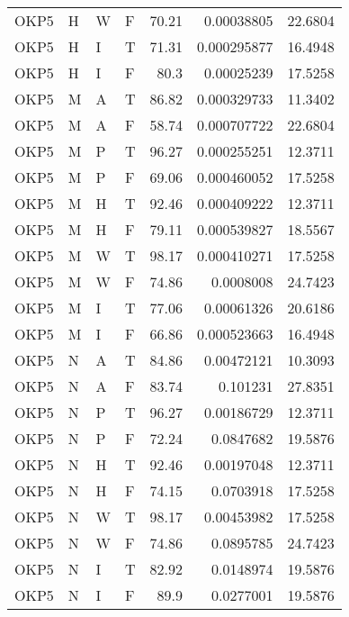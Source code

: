 \begin{table}[!htb]
{\begin{tabular}{llllrrr}
            OKP5     & H     & W     & F          & 70.21      & 0.00038805  & 22.6804  \\
            OKP5     & H     & I     & T          & 71.31      & 0.000295877 & 16.4948  \\
            OKP5     & H     & I     & F          & 80.3       & 0.00025239  & 17.5258  \\
            OKP5     & M     & A     & T          & 86.82      & 0.000329733 & 11.3402  \\
            OKP5     & M     & A     & F          & 58.74      & 0.000707722 & 22.6804  \\
            OKP5     & M     & P     & T          & 96.27      & 0.000255251 & 12.3711  \\
            OKP5     & M     & P     & F          & 69.06      & 0.000460052 & 17.5258  \\
            OKP5     & M     & H     & T          & 92.46      & 0.000409222 & 12.3711  \\
            OKP5     & M     & H     & F          & 79.11      & 0.000539827 & 18.5567  \\
            OKP5     & M     & W     & T          & 98.17      & 0.000410271 & 17.5258  \\
            OKP5     & M     & W     & F          & 74.86      & 0.0008008   & 24.7423  \\
            OKP5     & M     & I     & T          & 77.06      & 0.00061326  & 20.6186  \\
            OKP5     & M     & I     & F          & 66.86      & 0.000523663 & 16.4948  \\
            OKP5     & N     & A     & T          & 84.86      & 0.00472121  & 10.3093  \\
            OKP5     & N     & A     & F          & 83.74      & 0.101231    & 27.8351  \\
            OKP5     & N     & P     & T          & 96.27      & 0.00186729  & 12.3711  \\
            OKP5     & N     & P     & F          & 72.24      & 0.0847682   & 19.5876  \\
            OKP5     & N     & H     & T          & 92.46      & 0.00197048  & 12.3711  \\
            OKP5     & N     & H     & F          & 74.15      & 0.0703918   & 17.5258  \\
            OKP5     & N     & W     & T          & 98.17      & 0.00453982  & 17.5258  \\
            OKP5     & N     & W     & F          & 74.86      & 0.0895785   & 24.7423  \\
            OKP5     & N     & I     & T          & 82.92      & 0.0148974   & 19.5876  \\
            OKP5     & N     & I     & F          & 89.9       & 0.0277001   & 19.5876  \\
            \hline
        \end{tabular}
    }{}
\end{table}